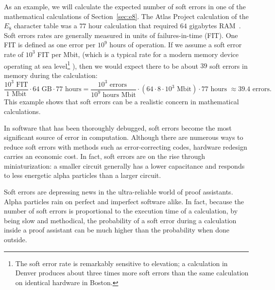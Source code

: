 \documentclass{llncs}
\begin{document}
As an example, we will calculate the expected number of soft errors in
one of the mathematical calculations of Section~\ref{sec:e8}.  The
Atlas Project calculation of the $E_8$ character table was a $77$ hour
calculation that required $64$ gigabytes RAM~\cite{AtlasSlides}.  Soft
errors rates are generally measured in units of failures-in-time
(FIT). One FIT is defined as one error per $10^9$ hours of operation.
If we assume a soft error rate of $10^3$ FIT per Mbit, (which is a
typical rate for a modern memory device operating at sea
level\footnote{The soft error rate is remarkably sensitive to
  elevation; a calculation in Denver produces about three times more
  soft errors than the same calculation on identical hardware in Boston.}
\cite{WP}),
 then we would expect there to be about $39$ soft
errors in memory during the calculation:
\[
\frac{10^3 \text{~FIT}}{1\text{~Mbit}} \cdot 64 \text{~GB} \cdot 77\text{~hours} =
\frac{10^3 \text{~errors~}}{10^9\text{~hours~}\text{Mbit}} \cdot
({64\cdot 8\cdot 10^3 \text{~Mbit}}) \cdot 77\text{~hours~} 
\approx 39.4 \text{~errors}.
\]
This example shows that soft errors can be a realistic concern in
mathematical calculations.

In software that has been thoroughly debugged, soft errors become the
most significant source of error in computation.  Although there are
numerous ways to reduce soft errors with methods such as error-correcting
codes, hardware redesign carries an economic cost.  In fact, soft errors are on
the rise through miniaturization: a smaller circuit generally has a lower
capacitance and responds to less energetic alpha particles than a larger
circuit.

Soft errors are depressing news in the ultra-reliable world of proof
assistants.  Alpha particles rain on perfect and imperfect software
alike.  In fact, because the number of
soft errors is proportional to the execution time of a calculation, by being
slow and methodical, the probability of a soft error during a
calculation inside a proof assistant can be much higher than the
probability when done outside.  
\end{document}
